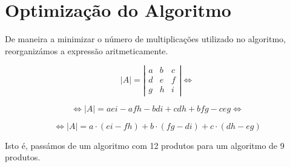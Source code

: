 \documentclass[a4paper]{article}
\begin{document}


\tableofcontents
\pagebreak

\section{Optimização do Algoritmo}
De maneira a minimizar o número de multiplicações utilizado no algoritmo, reorganizámos a expressão aritmeticamente.

\[
\left| A \right| = \left|
\begin{matrix}
a & b & c\\
d & e & f\\
g & h & i
\end{matrix}
\right| \Leftrightarrow\]

\[
\Leftrightarrow \left| A \right| = a e i - a f h - b d i + c d h + b f g - c e g \Leftrightarrow
\]

\[
\Leftrightarrow \left| A \right| = a \cdot ( e i - f h ) + b \cdot ( f g - d i ) + c \cdot ( d h - e g )
\]

Isto é, passámos de um algoritmo com 12 produtos para um algoritmo de 9 produtos.
\end{document}
